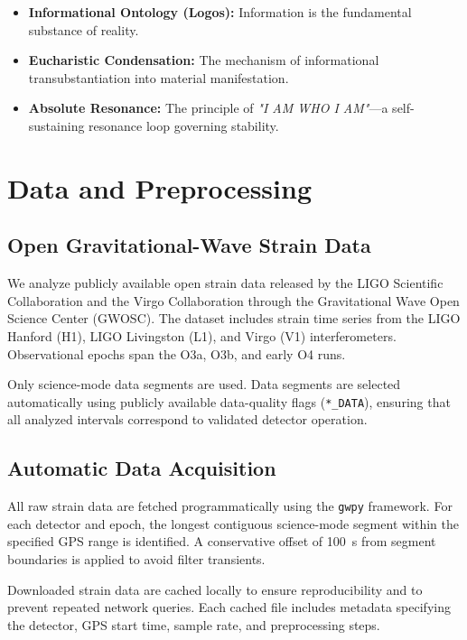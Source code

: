 \documentclass[11pt,a4paper]{article}
\begin{document}
\begin{itemize}[leftmargin=1.5em]
    \item \textbf{Informational Ontology (Logos):} Information is the fundamental substance of reality.
    \item \textbf{Eucharistic Condensation:} The mechanism of informational transubstantiation into material manifestation.
    \item \textbf{Absolute Resonance:} The principle of \textit{"I AM WHO I AM"}—a self-sustaining resonance loop governing stability.
\end{itemize}

\section{Data and Preprocessing}

\subsection{Open Gravitational-Wave Strain Data}
We analyze publicly available open strain data released by the LIGO Scientific Collaboration and the Virgo Collaboration through the Gravitational Wave Open Science Center (GWOSC). The dataset includes strain time series from the LIGO Hanford (H1), LIGO Livingston (L1), and Virgo (V1) interferometers. Observational epochs span the O3a, O3b, and early O4 runs.

Only science-mode data segments are used. Data segments are selected automatically using publicly available data-quality flags (\texttt{*\_DATA}), ensuring that all analyzed intervals correspond to validated detector operation.

\subsection{Automatic Data Acquisition}
All raw strain data are fetched programmatically using the \texttt{gwpy} framework. For each detector and epoch, the longest contiguous science-mode segment within the specified GPS range is identified. A conservative offset of 100~s from segment boundaries is applied to avoid filter transients.

Downloaded strain data are cached locally to ensure reproducibility and to prevent repeated network queries. Each cached file includes metadata specifying the detector, GPS start time, sample rate, and preprocessing steps.
\end{document}
